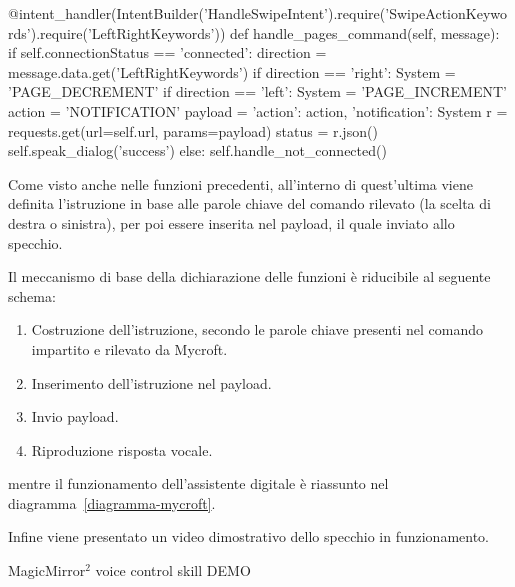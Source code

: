 \documentclass[12pt,a4paper]{article}
\begin{document}
\begin{MyVerbatim}
@intent_handler(IntentBuilder('HandleSwipeIntent').require('SwipeActionKeywords').require('LeftRightKeywords'))
def handle_pages_command(self, message):
    if self.connectionStatus == 'connected':
        direction = message.data.get('LeftRightKeywords')
        if direction == 'right':
            System = 'PAGE_DECREMENT'
        if direction == 'left':
            System = 'PAGE_INCREMENT'
        action = 'NOTIFICATION'
        payload = {'action': action, 'notification': System}
        r = requests.get(url=self.url, params=payload)
        status = r.json()
        self.speak_dialog('success')
    else:
        self.handle_not_connected()
\end{MyVerbatim}
Come visto anche nelle funzioni precedenti, all'interno di quest'ultima viene definita l'istruzione in base alle parole chiave
del comando rilevato (la scelta di destra o sinistra), per poi essere inserita nel payload, il quale inviato allo specchio.

Il meccanismo di base della dichiarazione delle funzioni \`e riducibile al seguente schema:
\begin{enumerate}
  \item Costruzione dell'istruzione, secondo le parole chiave presenti nel comando impartito e rilevato da Mycroft.
  \item Inserimento dell'istruzione nel payload.
  \item Invio payload.
  \item Riproduzione risposta vocale.
\end{enumerate}
mentre il funzionamento dell'assistente digitale \`e riassunto nel diagramma~\ref{diagramma-mycroft}.

Infine viene presentato un video dimostrativo dello specchio in funzionamento.
\begin{frame}{MagicMirror$^2$ voice control skill DEMO}
  \begin{center}
  \end{center}
\end{frame}
\end{document}
